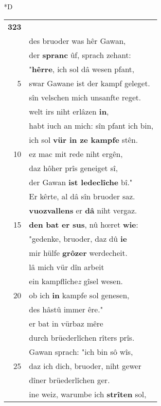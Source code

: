 \documentclass[8pt,a4paper,notitlepage]{article}
\begin{document}
\begin{table}[ht]
\begin{minipage}[t]{0.5\linewidth}
\small
\begin{center}*D
\end{center}
\begin{tabular}{rl}
\textbf{323} & \textit{\begin{large}B\end{large}}eacors, der stolze man,\\ 
 & des bruoder was hêr Gawan,\\ 
 & der \textbf{spranc} ûf, sprach zehant:\\ 
 & "\textbf{hêrre}, ich sol dâ wesen pfant,\\ 
5 & swar Gawane ist der kampf geleget.\\ 
 & sîn velschen mich unsanfte reget.\\ 
 & welt irs niht erlâzen \textbf{in},\\ 
 & habt iuch an mich: sîn pfant ich bin,\\ 
 & ich sol \textbf{vür in ze kampfe} stên.\\ 
10 & ez mac mit rede niht ergên,\\ 
 & daz hôher prîs geneiget sî,\\ 
 & der Gawan \textbf{ist ledeclîche} bî."\\ 
 & Er kêrte, al dâ sîn bruoder saz.\\ 
 & \textbf{vuozvallens} er \textbf{dâ} niht vergaz.\\ 
15 & \textbf{den bat er sus}, nû hœret \textbf{wie}:\\ 
 & "gedenke, bruoder, daz dû \textbf{ie}\\ 
 & mir hülfe \textbf{grôzer} werdecheit.\\ 
 & lâ mich vür dîn arbeit\\ 
 & ein kampflîche\textit{z} gîsel wesen.\\ 
20 & ob ich \textbf{in} kampfe sol genesen,\\ 
 & des hâstû immer êre."\\ 
 & er bat in vürbaz mêre\\ 
 & durch brüederlîchen rîters prîs.\\ 
 & Gawan sprach: "ich bin sô wîs,\\ 
25 & daz ich dich, bruoder, niht gewer\\ 
 & dîner brüederlîchen ger.\\ 
 & ine weiz, warumbe ich \textbf{strîten} sol,\\ 

\end{tabular}
\end{minipage}
\end{table}
\end{document}
